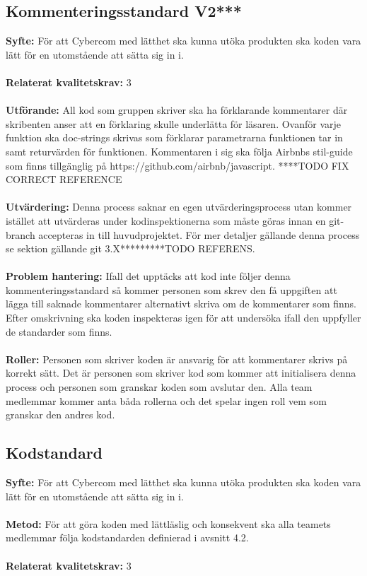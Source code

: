 \documentclass[10pt]{article}
\begin{document}
	\subsection{Kommenteringsstandard V2***}
	\textbf{Syfte:}	För att Cybercom med lätthet ska kunna utöka produkten ska koden vara lätt för en utomstående att sätta sig in i.
	\\\\
	\textbf{Relaterat kvalitetskrav:} 3
	\\\\
	\textbf{Utförande:} All kod som gruppen skriver ska ha förklarande kommentarer där skribenten anser att en förklaring skulle underlätta för läsaren. Ovanför varje funktion ska doc-strings skrivas som förklarar parametrarna funktionen tar in samt returvärden för funktionen.
	Kommentaren i sig ska följa Airbnbs stil-guide som finns tillgänglig på https://github.com/airbnb/javascript.
	****TODO FIX CORRECT REFERENCE
	\\\\
	\textbf{Utvärdering:} Denna process saknar en egen utvärderingsprocess utan kommer istället att utvärderas under kodinspektionerna som måste göras innan en git-branch accepteras in till huvudprojektet. För mer detaljer gällande denna process se sektion gällande git 3.X*********TODO REFERENS.
	\\\\
	\textbf{Problem hantering:} Ifall det upptäcks att kod inte följer denna kommenteringsstandard så kommer personen som skrev den få uppgiften att lägga till saknade kommentarer alternativt skriva om de kommentarer som finns. Efter omskrivning ska koden inspekteras igen för att undersöka ifall den uppfyller de standarder som finns.
	\\\\
	\textbf{Roller:} Personen som skriver koden är ansvarig för att kommentarer skrivs på korrekt sätt. Det är personen som skriver kod som kommer att initialisera denna process och personen som granskar koden som avslutar den. Alla team medlemmar kommer anta båda rollerna och det spelar ingen roll vem som granskar den andres kod.
	

	\subsection{Kodstandard}
	\textbf{Syfte:} För att Cybercom med lätthet ska kunna utöka produkten ska koden vara lätt för en utomstående att sätta sig in i.
	\\\\
	\textbf{Metod:} För att göra koden med lättläslig och konsekvent ska alla teamets medlemmar följa kodstandarden definierad i avsnitt 4.2.
	\\\\
	\textbf{Relaterat kvalitetskrav:} 3
	\\
	
\end{document}
